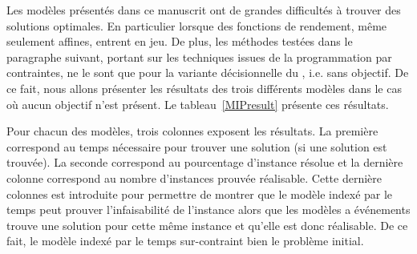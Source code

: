 Les modèles présentés dans ce manuscrit ont de grandes difficultés à
trouver des solutions optimales. En particulier lorsque des fonctions
de rendement, même seulement affines, entrent en jeu. De plus, les
méthodes testées dans le paragraphe suivant, portant sur les techniques
issues de la programmation par contraintes, ne le sont que pour la
variante décisionnelle du \CECSP, i.e. sans objectif. De ce fait, nous
allons présenter les résultats des trois différents modèles dans le
cas où aucun objectif n'est présent. Le tableau~\ref{MIPresult}
présente ces résultats. 

Pour chacun des modèles, trois colonnes exposent les résultats. La
première correspond au temps nécessaire pour trouver une solution (si
une solution est trouvée). La seconde correspond au pourcentage
d'instance résolue et la dernière colonne correspond au nombre
d'instances prouvée réalisable. Cette dernière colonnes est introduite
pour permettre de montrer que le modèle indexé par le temps peut
prouver l'infaisabilité de l'instance alors que les modèles a
événements trouve une solution pour cette même instance et qu'elle est
donc réalisable. De ce fait, le modèle indexé par le temps
sur-contraint bien le problème initial. 

